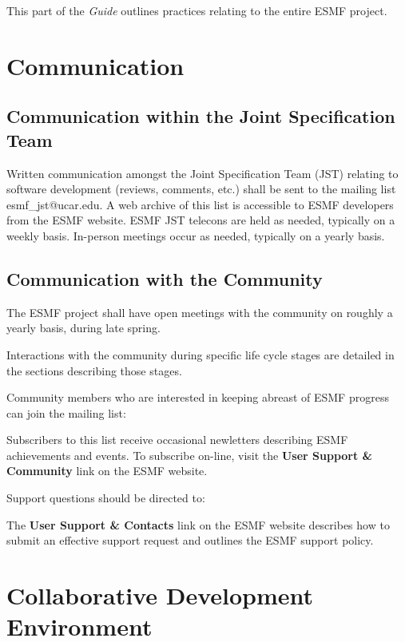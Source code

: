 
This part of the {\it Guide} outlines practices relating to the entire
ESMF project.

\section{Communication}

\subsection{Communication within the Joint Specification Team}
Written communication amongst the Joint Specification Team (JST) relating 
to software development (reviews, comments, etc.) shall be sent to
the mailing list esmf\_jst@ucar.edu.  A web archive of this list
is accessible to ESMF developers from the ESMF website.  ESMF JST
telecons are held as needed, typically on a weekly basis.  In-person
meetings occur as needed, typically on a yearly basis.

\subsection{Communication with the Community} 
The ESMF project shall have open meetings with the community on roughly a 
yearly basis, during late spring.  

Interactions with the community during specific life cycle stages
are detailed in the sections describing those stages.

Community members who are interested in keeping abreast of ESMF progress
can join the mailing list:
\begin{center}
\end{center}

Subscribers to this list receive occasional newletters describing ESMF 
achievements and events.  To subscribe on-line, visit the {\bf User 
Support \& Community} link on the ESMF website.

Support questions should be directed to:
\begin{center}
\end{center}

The {\bf User Support \& Contacts} link on the ESMF website describes
how to submit an effective support request and outlines the ESMF support
policy.

\section{Collaborative Development Environment}

